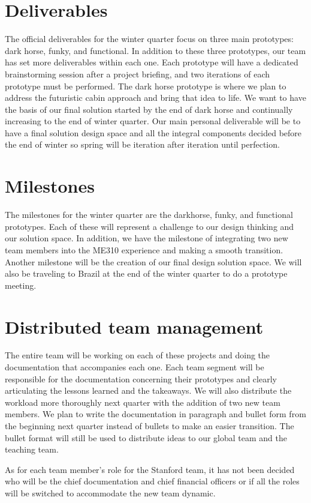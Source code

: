 \section{Deliverables}
The official deliverables for the winter quarter focus on three main prototypes: dark horse, funky, and functional.  In addition to these three prototypes, our team has set more deliverables within each one.  Each prototype will have a dedicated brainstorming session after a project briefing, and two iterations of each prototype must be performed. The dark horse prototype is where we plan to address the futuristic cabin approach and bring that idea to life.  We want to have the basis of our final solution started by the end of dark horse and continually increasing to the end of winter quarter.  Our main personal deliverable will be to have a final solution design space and all the integral components decided before the end of winter so spring will be iteration after iteration until perfection. 

\section{Milestones}
The milestones for the winter quarter are the darkhorse, funky, and functional prototypes.  Each of these will represent a challenge to our design thinking and our solution space.  In addition, we have the milestone of integrating two new team members into the ME310 experience and making a smooth transition.  Another milestone will be the creation of our final design solution space.  We will also be traveling to Brazil at the end of the winter quarter to do a prototype meeting. 

\section{Distributed team management}
The entire team will be working on each of these projects and doing the documentation that accompanies each one.  Each team segment will be responsible for the documentation concerning their prototypes and clearly articulating the lessons learned and the takeaways. We will also distribute the workload more thoroughly next quarter with the addition of two new team members.  We plan to write the documentation in paragraph and bullet form from the beginning next quarter instead of bullets to make an easier transition.  The bullet format will still be used to distribute ideas to our global team and the teaching team.  

As for each team member’s role for the Stanford team, it has not been decided who will be the chief documentation and chief financial officers or if all the roles will be switched to accommodate the new team dynamic. 

